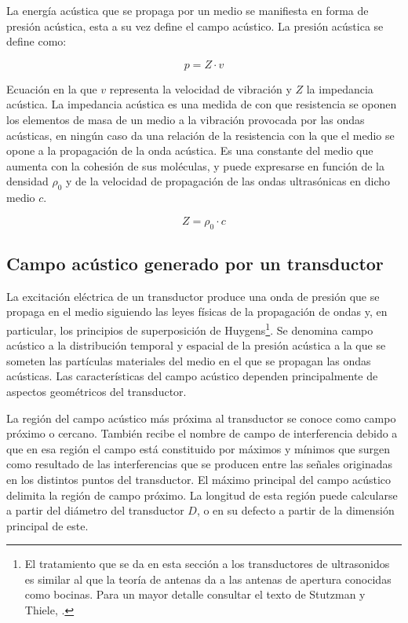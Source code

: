 La energía acústica que se propaga por un medio se manifiesta en forma de presión acústica, esta a su vez define el campo acústico. La presión acústica se define como:

\begin{equation}
	p = Z\cdot v
	\label{eq:acuospressure}
\end{equation}

Ecuación en la que $v$ representa la velocidad de vibración y $Z$ la impedancia acústica. La impedancia acústica es una medida de con que resistencia se oponen los elementos de masa de un medio a la vibración provocada por las ondas acústicas, en ningún caso da una relación de la resistencia con la que el medio se opone a la propagación de la onda acústica. Es una constante del medio que aumenta con la cohesión de sus moléculas, y puede expresarse en función de la densidad $\rho_0$ y de la velocidad de propagación de las ondas ultrasónicas en dicho medio $c$.

\begin{equation}
	Z = \rho_0\cdot c
	\label{eq:Zacoustic}
\end{equation}


\subsection{Campo acústico generado por un transductor}\label{subsec:field}

La excitación eléctrica de un transductor produce una onda de presión que se propaga en el medio siguiendo las leyes físicas de la propagación de ondas y, en particular, los principios de superposición de Huygens\footnote{El tratamiento que se da en esta sección a los transductores de ultrasonidos es similar al que la teoría de antenas da a las antenas de apertura conocidas como bocinas. Para un mayor detalle consultar el texto de Stutzman y Thiele, \cite{stutzman1997atd}.}. Se denomina campo acústico a la distribución temporal y espacial de la presión acústica a la que se someten las partículas materiales del medio en el que se propagan las ondas acústicas. Las características del campo acústico dependen principalmente de aspectos geométricos del transductor.\par
La región del campo acústico más próxima al transductor se conoce como campo próximo o cercano. También recibe el nombre de campo de interferencia debido a que en esa región el campo está constituido por máximos y mínimos que surgen como resultado de las interferencias que se producen entre las señales originadas en los distintos puntos del transductor. El máximo principal del campo acústico delimita la región de campo próximo. La longitud de esta región puede calcularse a partir del diámetro del transductor $D$, o en su defecto a partir de la dimensión principal de este.


